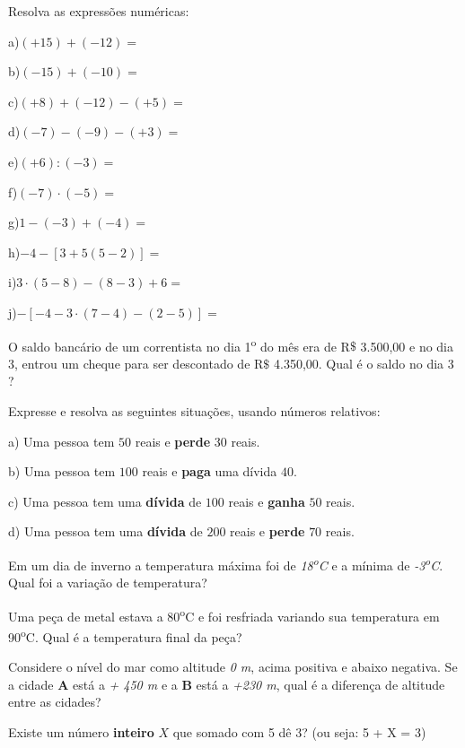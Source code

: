 \begin{exercicios}

	\exitem{} Resolva as expressões numéricas:
    \begin{multicols}{2}
        a)$(+15)+(-12) =$
        
        b)$(-15)+(-10) =$

        c)$(+8)+(-12)-(+5) =$
        
        d)$(-7)-(-9)-(+3) =$

        e)$(+6) : (-3) =$
        
        f)$(-7) \cdot (-5) =$

        g)$1- (-3)+(-4)=$
        
        h)$-4-[3+5(5 - 2)]=$

        i)$3\cdot(5 - 8)-(8 - 3)+6 =$
        
        j)$-[-4 -3\cdot(7-4)-(2-5)]=$
    \end{multicols}
	\exitem{} O saldo bancário de um correntista no dia 1\textsuperscript{o }do mês era de R$\$$  3.500,00 e no dia 3, entrou um cheque para ser descontado de R$\$$  4.350,00. Qual é o saldo no dia 3 ?

	\exitem{} Expresse e resolva as seguintes situações, usando números relativos:

    \quad a) Uma pessoa tem $50$ reais e \textbf{perde} $30$ reais.

    \quad b) Uma pessoa tem $100$ reais e \textbf{paga} uma dívida $40$.

    \quad c) Uma pessoa tem uma \textbf{dívida} de $100$ reais e \textbf{ganha} $50$ reais.

    \quad d) Uma pessoa tem uma \textbf{dívida} de $200$ reais e \textbf{perde} $70$ reais.

	\exitem{} Em um dia de inverno a temperatura máxima foi de \textit{18\textsuperscript{o}C} e a mínima de \textit{-3\textsuperscript{o}C}. Qual foi a variação de temperatura?

	\exitem{} Uma peça de metal estava a 80\textsuperscript{o}C e foi resfriada variando sua temperatura em 90\textsuperscript{o}C. Qual é a temperatura final da peça?

	\exitem{} Considere o nível do mar como altitude \textit{0 m}, acima positiva e abaixo negativa. Se a cidade \textbf{A} está a \textit{+ 450 m} e a \textbf{B} está a \textit{+230 m}, qual é a diferença de altitude entre as cidades?

	\exitem{} Existe um número \textbf{inteiro} $X$ que somado com 5 dê 3? (ou seja: 5 + X = 3)


\end{exercicios}
